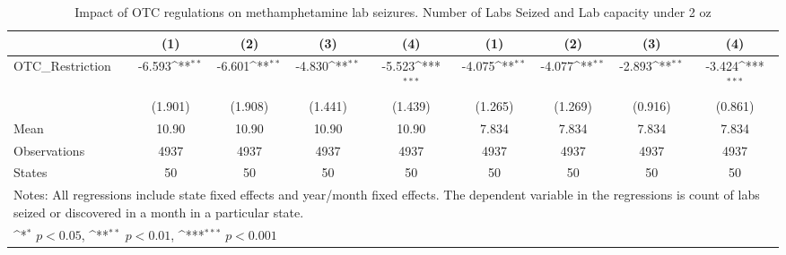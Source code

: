 \begin{table}[htbp]\centering
\def\sym#1{\ifmmode^{#1}\else\(^{#1}\)\fi}
\caption{Impact of OTC regulations on methamphetamine lab seizures. Number of Labs Seized and Lab capacity under 2 oz \label{fe-results}}
\begin{tabular}{l*{8}{c}}
\hline\hline
          &\multicolumn{1}{c}{(1)}&\multicolumn{1}{c}{(2)}&\multicolumn{1}{c}{(3)}&\multicolumn{1}{c}{(4)}&\multicolumn{1}{c}{(1)}&\multicolumn{1}{c}{(2)}&\multicolumn{1}{c}{(3)}&\multicolumn{1}{c}{(4)}\\
\hline
OTC\_Restriction&   -6.593\sym{**} &   -6.601\sym{**} &   -4.830\sym{**} &   -5.523\sym{***}&   -4.075\sym{**} &   -4.077\sym{**} &   -2.893\sym{**} &   -3.424\sym{***}\\
          &  (1.901)         &  (1.908)         &  (1.441)         &  (1.439)         &  (1.265)         &  (1.269)         &  (0.916)         &  (0.861)         \\
\hline
Mean      &    10.90         &    10.90         &    10.90         &    10.90         &    7.834         &    7.834         &    7.834         &    7.834         \\
Observations&     4937         &     4937         &     4937         &     4937         &     4937         &     4937         &     4937         &     4937         \\
States    &       50         &       50         &       50         &       50         &       50         &       50         &       50         &       50         \\
\hline\hline
\multicolumn{9}{l}{\footnotesize Notes: All regressions include state fixed effects and year/month fixed effects. The dependent variable in the regressions is count of labs seized or discovered in a month in a particular state.}\\
\multicolumn{9}{l}{\footnotesize \sym{*} \(p<0.05\), \sym{**} \(p<0.01\), \sym{***} \(p<0.001\)}\\
\end{tabular}
\end{table}
